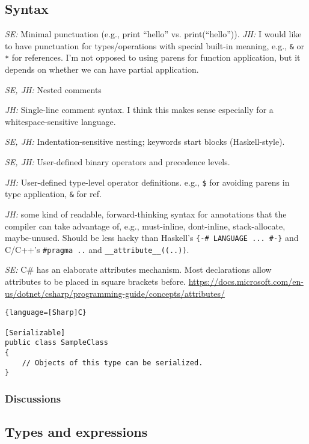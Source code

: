 \documentclass{article}
\begin{document}
\subsection{Syntax}

\textit{SE:} Minimal punctuation (e.g., print ``hello'' vs. print(``hello'')).
\textit{JH:} I would like to have punctuation for types/operations with special
built-in meaning, e.g., \verb|&| or \verb|*| for references. I'm not opposed to
using parens for function application, but it depends on whether we can have
partial application.

\textit{SE, JH:} Nested comments

\textit{JH:} Single-line comment syntax. I think this makes sense especially for
a whitespace-sensitive language.

\textit{SE, JH:} Indentation-sensitive nesting; keywords start blocks (Haskell-style).

\textit{SE, JH:} User-defined binary operators and precedence levels.

\textit{JH:} User-defined type-level operator definitions. e.g., \verb|$| for
avoiding parens in type application, \verb|&| for ref.

\textit{JH:} some kind of readable, forward-thinking syntax for annotations that
the compiler can take advantage of, e.g., must-inline, dont-inline,
stack-allocate, maybe-unused. Should be less hacky than Haskell's
\verb|{-# LANGUAGE ... #-}| and C/C++'s \verb|#pragma ..| and
\verb|__attribute__((..))|.

\textit{SE:} C\# has an elaborate attributes mechanism.
Most declarations allow attributes to be placed in square brackets before.  \url{https://docs.microsoft.com/en-us/dotnet/csharp/programming-guide/concepts/attributes/}

\begin{lstlisting}{language=[Sharp]C}
  
[Serializable]
public class SampleClass
{
    // Objects of this type can be serialized.
} 
\end{lstlisting}

\subsubsection{Discussions}

\subsection{Types and expressions}
\end{document}
